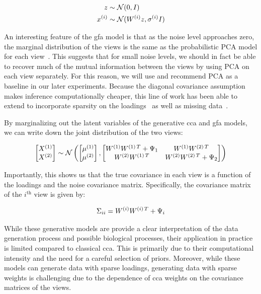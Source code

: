 \begin{align}
    z& \sim \mathcal{N}(0, I)\\
    x^{(i)} & \sim \mathcal{N}(W^{(i)} z, \sigma^{(i)}I)
\end{align}

An interesting feature of the \acrshort{gfa} model is that as the noise level approaches zero, the marginal distribution of the views is the same as the probabilistic PCA model for each view~\citep{tipping1999probabilistic}.
This suggests that for small noise levels, we should in fact be able to recover much of the mutual information between the views by using PCA on each view separately.
For this reason, we will use and recommend PCA as a baseline in our later experiments.
Because the diagonal covariance assumption makes inference computationally cheaper, this line of work has been able to extend to incorporate sparsity on the loadings~\citep{virtanen2011bayesian} as well as missing data~\citep{ferreira2022hierarchical}.

By marginalizing out the latent variables of the generative \acrshort{cca} and \acrshort{gfa} models, we can write down the joint distribution of the two views:

\begin{align}
    \begin{bmatrix}
        X^{(1)} \\ X^{(2)}
    \end{bmatrix} \sim \mathcal{N} \left( \begin{bmatrix}
                                              \mu^{(1)} \\ \mu^{(2)}
    \end{bmatrix}, \begin{bmatrix}
                       W^{(1)}W^{(1)\,T} + \Psi_1 & W^{(1)}W^{(2)\,T} \\ W^{(2)}W^{(1)\,T} & W^{(2)}W^{(2)\,T} + \Psi_2
    \end{bmatrix} \right)
\end{align}

Importantly, this shows us that the true covariance in each view is a function of the \gls{loadings} and the noise covariance matrix.
Specifically, the covariance matrix of the $i^{\text{th}}$ view is given by:

\begin{align}
    \Sigma_{ii} = W^{(i)}W^{(i)\,T} + \Psi_i
\end{align}

While these generative models are provide a clear interpretation of the data generation process and possible biological processes, their application in practice is limited compared to classical \acrshort{cca}.
This is primarily due to their computational intensity and the need for a careful selection of priors.
Moreover, while these models can generate data with sparse loadings, generating data with sparse weights is challenging due to the dependence of \acrshort{cca} weights on the covariance matrices of the views.

